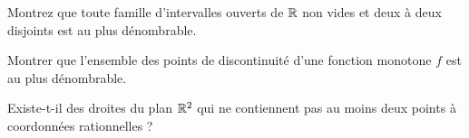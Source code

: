 \documentclass[a4paper,12pt,reqno]{amsart}
\begin{document}
\begin{exo} %

  Montrez que toute famille d'intervalles ouverts de $\mathbb{R}$ non vides et
  deux à deux disjoints est au plus dénombrable.

\end{exo}

\begin{exo} %

  Montrer que l'ensemble des points de discontinuité d'une fonction monotone $f$ est au plus dénombrable.

\end{exo}

\begin{exo}  %

  Existe-t-il des droites du plan $\mathbb{R}^2$ qui ne contiennent pas au moins deux points à coordonnées rationnelles ?

\end{exo}
\end{document}
